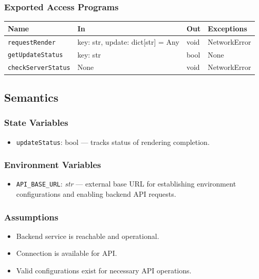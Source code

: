 \documentclass[12pt, titlepage]{article}
\begin{document}
\subsubsection{Exported Access Programs}
\begin{center}
\renewcommand{\arraystretch}{1.55}
\begin{tabular}{p{4cm} p{5cm} p{3cm} p{3cm}}
\hline
\textbf{Name} & \textbf{In} & \textbf{Out} & \textbf{Exceptions} \\ \hline
\texttt{requestRender} & key: str, \newline update: dict[str] = Any & void & NetworkError \\
\texttt{getUpdateStatus} & key: str & bool & None \\
\texttt{checkServerStatus} & None & void & NetworkError \\
\hline
\end{tabular}
\end{center}



\subsection{Semantics}

\subsubsection{State Variables}
\begin{itemize}
  \item \texttt{updateStatus}: bool — tracks status of rendering completion.
\end{itemize}

\subsubsection{Environment Variables}
\begin{itemize}
  \item \texttt{API\_BASE\_URL}: \textit{str} — external base URL for establishing environment configurations and enabling backend API requests.
\end{itemize}

\subsubsection{Assumptions}
\begin{itemize}
  \item Backend service is reachable and operational.
  \item Connection is available for API.
  \item Valid configurations exist for necessary API operations.
\end{itemize}
\end{document}
